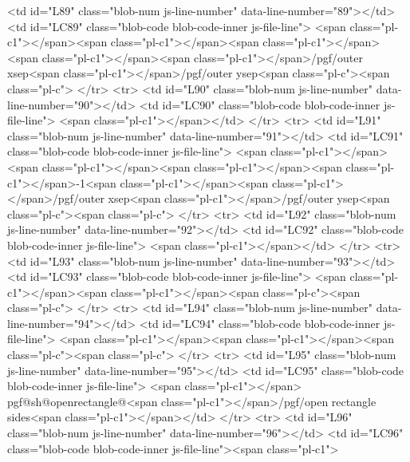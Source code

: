 {{        <td id="L89" class="blob-num js-line-number" data-line-number="89"></td>
        <td id="LC89" class="blob-code blob-code-inner js-file-line">    <span class="pl-c1">\pgfextract@process\SW</span>{<span class="pl-c1">\pgfpointadd</span>{<span class="pl-c1">\southwest</span>}{<span class="pl-c1">\pgfpoint</span>{<span class="pl-c1">\pgfkeysvalueof</span>{/pgf/outer xsep}}{<span class="pl-c1">\pgfkeysvalueof</span>{/pgf/outer ysep}}}}<span class="pl-c"><span class="pl-c">%
      </tr>
      <tr>
        <td id="L90" class="blob-num js-line-number" data-line-number="90"></td>
        <td id="LC90" class="blob-code blob-code-inner js-file-line">    <span class="pl-c1">\pgf@xa\pgf@x\pgf@ya\pgf@y</span></td>
      </tr>
      <tr>
        <td id="L91" class="blob-num js-line-number" data-line-number="91"></td>
        <td id="LC91" class="blob-code blob-code-inner js-file-line">    <span class="pl-c1">\pgfextract@process\NE</span>{<span class="pl-c1">\pgfpointadd</span>{<span class="pl-c1">\northeast</span>}{<span class="pl-c1">\pgfpointscale</span>{-1}{<span class="pl-c1">\pgfpoint</span>{<span class="pl-c1">\pgfkeysvalueof</span>{/pgf/outer xsep}}{<span class="pl-c1">\pgfkeysvalueof</span>{/pgf/outer ysep}}}}}<span class="pl-c"><span class="pl-c">%
      </tr>
      <tr>
        <td id="L92" class="blob-num js-line-number" data-line-number="92"></td>
        <td id="LC92" class="blob-code blob-code-inner js-file-line">    <span class="pl-c1">\pgf@xb\pgf@x\pgf@yb\pgf@y</span></td>
      </tr>
      <tr>
        <td id="L93" class="blob-num js-line-number" data-line-number="93"></td>
        <td id="LC93" class="blob-code blob-code-inner js-file-line">    <span class="pl-c1">\pgfextract@process\NW</span>{<span class="pl-c1">\pgf@x\pgf@xa\pgf@y\pgf@yb</span>}<span class="pl-c"><span class="pl-c">%
      </tr>
      <tr>
        <td id="L94" class="blob-num js-line-number" data-line-number="94"></td>
        <td id="LC94" class="blob-code blob-code-inner js-file-line">    <span class="pl-c1">\pgfextract@process\SE</span>{<span class="pl-c1">\pgf@x\pgf@xb\pgf@y\pgf@ya</span>}<span class="pl-c"><span class="pl-c">%
      </tr>
      <tr>
        <td id="L95" class="blob-num js-line-number" data-line-number="95"></td>
        <td id="LC95" class="blob-code blob-code-inner js-file-line">    <span class="pl-c1">\csname</span> pgf@sh@openrectangle@<span class="pl-c1">\pgfkeysvalueof</span>{/pgf/open rectangle sides}<span class="pl-c1">\endcsname</span>}}</td>
      </tr>
      <tr>
        <td id="L96" class="blob-num js-line-number" data-line-number="96"></td>
        <td id="LC96" class="blob-code blob-code-inner js-file-line"><span class="pl-c1">\endinput</span></td>
      </tr>
</table>

